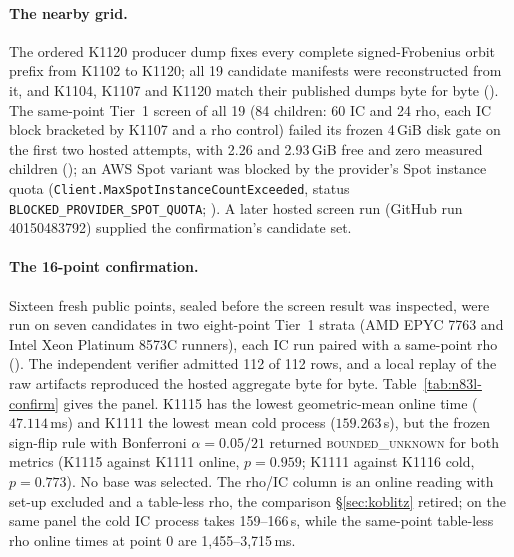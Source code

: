 \paragraph{The nearby grid.} The ordered K1120 producer dump fixes every
complete signed-Frobenius orbit prefix from K1102 to K1120; all 19 candidate
manifests were reconstructed from it, and K1104, K1107 and K1120 match their
published dumps byte for byte
(). The same-point
Tier~1 screen of all 19 (84 children: 60 IC and 24 rho, each IC block
bracketed by K1107 and a rho control) failed its frozen 4\,GiB disk gate on
the first two hosted attempts, with 2.26 and 2.93\,GiB free and zero
measured children ();
an AWS Spot variant was blocked by the provider's Spot instance quota
(\texttt{Client.MaxSpotInstanceCountExceeded}, status
\texttt{BLOCKED\_PROVIDER\_SPOT\_QUOTA};
).
A later hosted screen run (GitHub run 40150483792) supplied the
confirmation's candidate set.

\paragraph{The 16-point confirmation.} Sixteen fresh public points, sealed
before the screen result was inspected, were run on seven candidates in two
eight-point Tier~1 strata (AMD EPYC 7763 and Intel Xeon Platinum 8573C
runners), each IC run paired with a same-point rho
(). The
independent verifier admitted 112 of 112 rows, and a local replay of the raw
artifacts reproduced the hosted aggregate byte for byte.
Table~\ref{tab:n83l-confirm} gives the panel. K1115 has the lowest
geometric-mean online time ($47.114$\,ms) and K1111 the lowest mean cold
process ($159.263$\,s), but the frozen sign-flip rule with Bonferroni
$\alpha=0.05/21$ returned \textsc{bounded\_unknown} for both metrics (K1115
against K1111 online, $p=0.959$; K1111 against K1116 cold, $p=0.773$). No
base was selected. The rho/IC column is an online reading with set-up
excluded and a table-less rho, the comparison \S\ref{sec:koblitz} retired;
on the same panel the cold IC process takes 159--166\,s, while the
same-point table-less rho online times at point 0 are
1{,}455--3{,}715\,ms.


